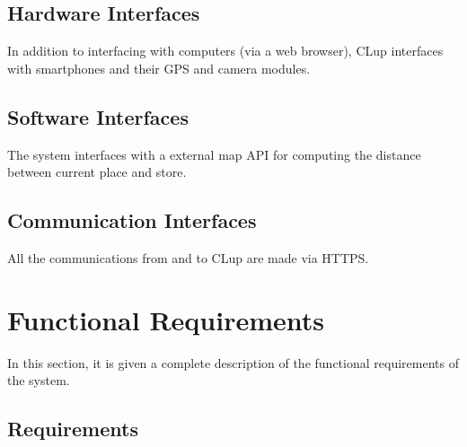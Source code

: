 \clearpage

\subsection{Hardware Interfaces}
In addition to interfacing with computers (via a web browser), CLup interfaces with smartphones and their GPS and camera modules.

\subsection{Software Interfaces}
The system interfaces with a external map API for computing the distance between current place and store.

\subsection{Communication Interfaces}
All the communications from and to CLup are made via HTTPS.

\section{Functional Requirements}
In this section, it is given a complete description of the functional requirements of the system.

    \subsection{Requirements}
